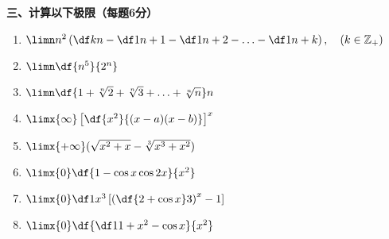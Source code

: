 {\bf 三、计算以下极限（每题6分）}
\begin{enumerate}[(1)]
  \setlength{\itemindent}{1cm}
  \item $\limn n^2\left(\df
  kn-\df1{n+1}-\df1{n+2}-\ldots-\df1{n+k}\right),\quad(k\in\mathbb{Z}_+)$\\[4cm]
  \item $\limn\df{n^5}{2^n}$\\[4cm]
  \item $\limn\df{1+\sqrt[n]2+\sqrt[n]3+\ldots+\sqrt[n]n}n$\\[4cm]
  \item $\limx{\infty}\left[\df{x^2}{(x-a)(x-b)}\right]^x$\\[4cm]
  \item $\limx{+\infty}(\sqrt{x^2+x}-\sqrt[3]{x^3+x^2})$\\[4cm]
  \item $\limx{0}\df{1-\cos x\cos 2x}{x^2}$\\[4cm]
  \item $\limx{0}\df1{x^3}\left[\left(\df{2+\cos x}3\right)^x-1\right]$\\[4cm]
  \item $\limx{0}\df{\df1{1+x^2}-\cos x}{x^2}$\\[4cm]
\end{enumerate}


